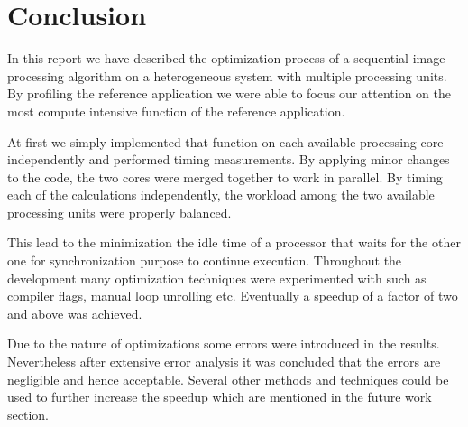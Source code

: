 \section{Conclusion}
\label{sec:Conclusion}
 In this report we have described the optimization process of a sequential image processing algorithm on a heterogeneous system with multiple processing units.
By profiling the reference application we were able to focus our attention on the most compute intensive function of the reference application.

At first we simply implemented that function on each available processing core independently and performed timing measurements. By applying minor changes to the code, the two cores were merged together to work in parallel.
By timing each of the calculations independently, the workload among the two available processing units were properly balanced.

This lead to the minimization the idle time of a processor that waits for the other one for synchronization purpose to continue execution.
Throughout the development many optimization techniques were experimented with such as compiler flags, manual loop unrolling etc.
Eventually a speedup of a factor of two and above was achieved. 

Due to the nature of optimizations some errors were introduced in the results. Nevertheless after extensive error analysis it was concluded that the errors are negligible and hence acceptable. Several other methods and techniques could be used to further increase the speedup which are mentioned in the future work section.